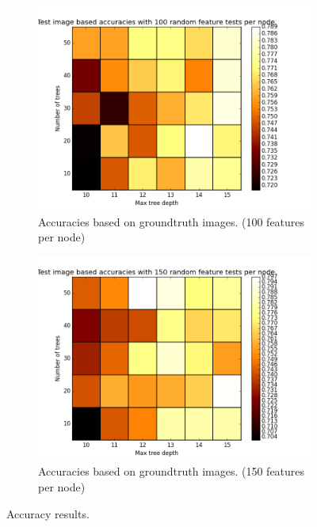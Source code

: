 \begin{figure}
	\begin{subfigure}{0.4\textwidth}
		\centering
		\includegraphics[width=\textwidth]{plots/heatmap_iacc_100.png}
		\caption{\scriptsize Accuracies based on groundtruth images. (100 features per node)}
		\label{subfig:result_heatmap_iacc_100}
	\end{subfigure}
  \hspace{0.05\textwidth}
	\begin{subfigure}{0.4\textwidth}
		\centering
		\includegraphics[width=\textwidth]{plots/heatmap_iacc_150.png}
		\caption{\scriptsize Accuracies based on groundtruth images. (150 features per node)}
		\label{subfig:result_heatmap_iacc_150}
	\end{subfigure}
	\caption{Accuracy results.}
	\label{fig:result_heatmap}
\end{figure}

